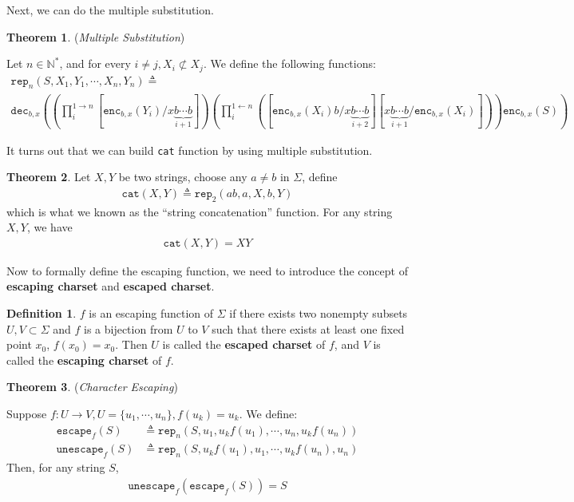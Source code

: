 \documentclass{article}
\theoremstyle{definition}
\newtheorem{theorem}{Theorem}[section]
\newtheorem{definition}{Definition}[section]
\begin{document}
Next, we can do the multiple substitution.

\begin{theorem}
    (\emph{Multiple Substitution})

    Let $n\in \mathbb{N}^*$, and for every $i\neq j, X_i \not\subset X_j$. We define the following functions:
    \begin{multline}
        \mathtt{rep}_n(S, X_1, Y_1, \cdots, X_n, Y_n) \triangleq \\
        \mathtt{dec}_{b,x}\left((\prod_i^{1\rightarrow n} [\mathtt{enc}_{b,x}(Y_i)/x\underbrace{b\cdots b}_{i+1}])(\prod_i^{1\leftarrow n} ([\mathtt{enc}_{b,x}(X_i)b/x\underbrace{b\cdots b}_{i+2}][x\underbrace{b\cdots b}_{i+1}/\mathtt{enc}_{b,x}(X_i)]))\mathtt{enc}_{b,x}(S)\right)
    \end{multline}
    \label{lem:multiple substitution}
\end{theorem}

It turns out that we can build \texttt{cat} function by using multiple substitution.

\begin{theorem}
    Let $X,Y$ be two strings, choose any $a\neq b$ in $\Sigma$, define
    \begin{align}
        \mathtt{cat}(X,Y) \triangleq \mathtt{rep}_{2}(ab, a, X, b, Y)
    \end{align}
    which is what we known as the ``string concatenation'' function.
    For any string $X,Y$, we have
    \begin{align}
        \mathtt{cat}(X,Y) = XY
    \end{align}
\end{theorem}

Now to formally define the escaping function, we need to introduce the concept of \textbf{escaping charset} and \textbf{escaped charset}.

\begin{definition}
    $f$ is an escaping function of $\Sigma$ if there exists two nonempty subsets $U,V\subset \Sigma$ and $f$ is a bijection from $U$ to $V$ such that there exists at least one fixed point $x_0$, $f(x_0)=x_0$. Then $U$ is called the \textbf{escaped charset} of $f$, and $V$ is called the \textbf{escaping charset} of $f$.
\end{definition}

\begin{theorem}
    (\emph{Character Escaping})

    Suppose $f: U\rightarrow V, U=\{u_1,\cdots,u_n\}, f(u_k)=u_k$.
    We define:
    \begin{align}
        \mathtt{escape}_f(S)   & \triangleq \mathtt{rep}_n(S,u_1,u_kf(u_1),\cdots, u_n,u_kf(u_n))  \\
        \mathtt{unescape}_f(S) & \triangleq \mathtt{rep}_n(S,u_kf(u_1),u_1,\cdots, u_kf(u_n), u_n)
    \end{align}
    Then, for any string $S$,
    \begin{align}
        \mathtt{unescape}_f(\mathtt{escape}_f(S)) = S
    \end{align}
\end{theorem}

\end{document}
